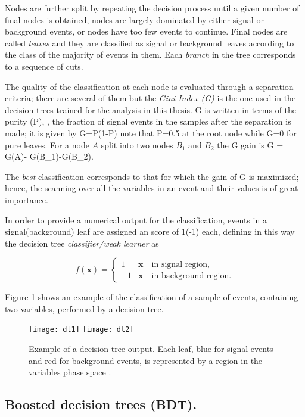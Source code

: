 Nodes are further split by repeating the decision process until a given number of final nodes is obtained, nodes are largely dominated by either signal or background events, or nodes have too few events to continue. Final nodes are called \textit{leaves} and they are classified as signal or background leaves according to the class of the majority of events in them. Each \textit{branch} in the tree corresponds to a sequence of cuts. 

The quality of the classification at each node is evaluated through a separation criteria; there are several of them but the \textit{Gini Index (G)} is the one used in the decision trees trained for the analysis in this thesis. G is written in terms of the purity (P), \ie, the fraction of signal events in the samples after the separation is made; it is given by
\beqn
G=P(1-P)
\eeqn
\noindent note that P=0.5 at the root node while G=0 for pure leaves. For a node $A$ split into two nodes $B_1$ and $B_2$ the G gain is
\beqn
\Delta G = G(A)- G(B_1)-G(B_2).
\eeqn

The \textit{best} classification corresponds to that for which the gain of G is maximized; hence, the scanning over all the variables in an event and their values is of great importance.

In order to provide a numerical output for the classification, events in a signal(background) leaf are assigned an score of 1(-1) each, defining in this way the decision tree \textit{classifier/weak learner} as

\[
f(\textbf{x}) = \left\{
\begin{array}{ll}
  1  &  \textbf{x} \quad \textrm{in signal region,}\\
  -1 &  \textbf{x} \quad \textrm{in background region.}
\end{array}
\right.
\]

Figure \ref{fig:dtr} shows an example of the classification of a sample of events, containing two variables, performed by a decision tree.

\begin{figure}[!h]
  \centering
  \texttt{[image: dt1]}
  \texttt{[image: dt2]}
  \caption[Decision tree output example.]{Example of a decision tree output. Each leaf, blue for signal events and red for background events, is represented by a region in the variables phase space \cite{coadou}.}\label{fig:dtr}
\end{figure}

\subsection{Boosted decision trees (BDT).}

